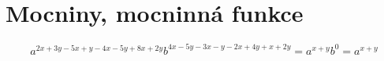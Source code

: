 
\BeginDoc{}
\def\dec{\left| 
\begin{array}{ccc}}
\def\dee{\end{array}
\right|}
\def\d{\rm d}
\section{Mocniny, mocninná funkce}
$$
a^{2x+3y-5x+y-4x-5y+8x+2y} b^{4x-5y-3x-y-2x+4y+x+2y}
=
a^{x+y}b^{0} = a^{x+y}
$$
\EndDoc
